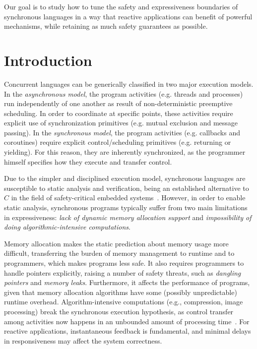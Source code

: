 \documentclass[pdftex,12pt,a4paper]{article}
\begin{document}
Our goal is to study how to tune the safety and expressiveness boundaries of
synchronous languages in a way that reactive applications can benefit of 
powerful mechanisms, while retaining as much safety guarantees as possible.

\section{Introduction}

Concurrent languages can be generically classified in two major execution 
models.
%
In the \emph{asynchronous model}, the program activities (e.g. threads and 
processes) run independently of one another as result of non-deterministic 
preemptive scheduling.
In order to coordinate at specific points, these activities require explicit 
use of synchronization primitives (e.g. mutual exclusion and message passing).
%
In the \emph{synchronous model}, the program activities (e.g. callbacks and 
coroutines) require explicit control/scheduling primitives (e.g. returning or 
yielding).
For this reason, they are inherently synchronized, as the programmer himself 
specifies how they execute and transfer control.

Due to the simpler and disciplined execution model, synchronous languages are 
susceptible to static analysis and verification, being an established 
alternative to $C$ in the field of safety-critical embedded 
systems~\cite{rp.twelve}.
%
However, in order to enable static analysis, synchronous programs typically 
suffer from two main limitations in expressiveness:
\emph{lack of dynamic memory allocation support} and
\emph{impossibility of doing algorithmic-intensive computations}.

Memory allocation makes the static prediction about memory usage more 
difficult, transferring the burden of memory management to runtime and to 
programmers, which makes programs less safe.
It also requires programmers to handle pointers explicitly, raising a number of 
safety threats, such as \emph{dangling pointers} and \emph{memory leaks}.
Furthermore, it affects the performance of programs, given that memory 
allocation algorithms have some (possibly unpredictable) runtime overhead.
%
%
Algorithm-intensive computations (e.g., compression, image processing) break 
the synchronous execution hypothesis, as control transfer among activities now 
happens in an unbounded amount of processing time~\cite{rp.hypothesis}.
%
For reactive applications, instantaneous feedback is fundamental, and minimal 
delays in responsiveness may affect the system correctness.
\end{document}
